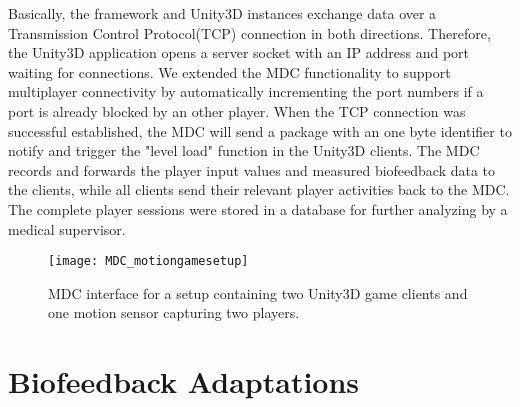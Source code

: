 \begin{multicols}{2}
 Basically, the framework and Unity3D instances exchange data over a Transmission Control Protocol(TCP) connection in both directions. Therefore, the Unity3D application opens a server socket with an IP address and port waiting for connections. We extended the MDC functionality to support multiplayer connectivity by automatically incrementing the port numbers if a port is already blocked by an other player. When the TCP connection was successful established, the MDC will send a package with an one byte identifier to notify and trigger the "level load" function in the Unity3D clients. The MDC records and forwards the player input values and measured biofeedback data to the clients, while all clients send their relevant player activities back to the MDC. The complete player sessions were stored in a database for further analyzing by a medical supervisor.

\begin{figure}[H]
  \centering
    \texttt{[image: MDC\_motiongamesetup]}
 \caption{MDC interface for a setup containing two Unity3D game clients and one motion sensor capturing two players.}
\end{figure}


\section{Biofeedback Adaptations}


\end{multicols}
